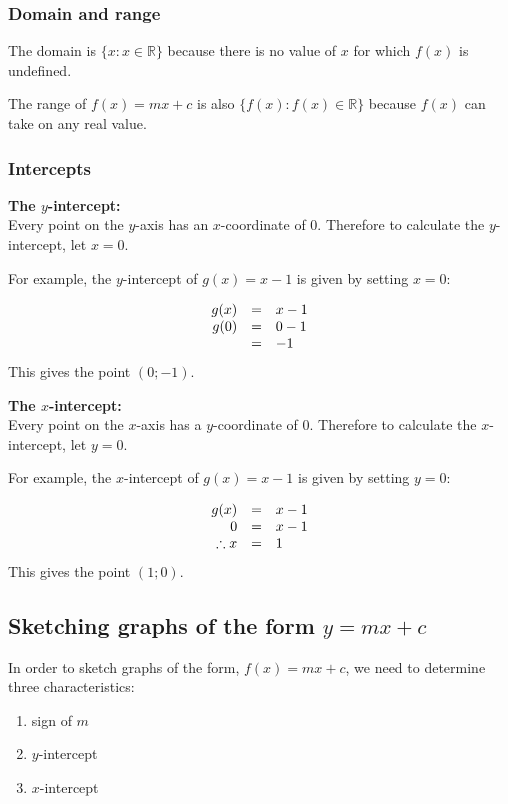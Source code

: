 \subsubsection*{Domain and range}
\nopagebreak
The domain is $\{x:x\in \mathbb{R}\}$ because there
is no value of $x$ for which $f(x)$ is undefined.

The range of $f(x)=mx+c$ is also $\{f(x):f(x)\in \mathbb{R}\}$ because
$f(x)$ can take on any real value.

\subsubsection*{Intercepts}
\textbf{The $y$-intercept:}\\
Every point on the $y$-axis has an $x$-coordinate of $0$. Therefore to calculate the $y$-intercept, let $x=0$.\par
For example, the $y$-intercept of $g(x)=x-1$ is given by setting $x=0$:\par 

\begin{equation*}
  \begin{array}{ccl}\hfill g(x)& =& x-1\hfill \\
    \hfill g(0) &=& 0-1\hfill \\
    & =& -1\hfill 
  \end{array}
\end{equation*}
This gives the point $(0;-1)$.
\par
\textbf{The $x$-intercept:}\\
Every point on the $x$-axis has a $y$-coordinate of $0$. Therefore to
calculate the $x$-intercept, let $y=0$.

For example, the $x$-intercept of $g(x)=x-1$ is given by setting
$y=0$:

\begin{equation*}
  \begin{array}{ccl}\hfill g(x)& =& x-1\hfill \\
    \hfill 0& =& x-1\hfill \\
    \hfill \therefore x& =& 1\hfill 
  \end{array}
\end{equation*}
This gives the point $(1;0)$.


\subsection*{Sketching graphs of the form $y=mx+c$}


In order to sketch graphs of the form, $f(x)=mx+c$, we need to determine three characteristics:\par 
\begin{enumerate}[noitemsep, label=\textbf{\arabic*}. ] 
\item sign of $m$
\item $y$-intercept
\item $x$-intercept
\end{enumerate}

